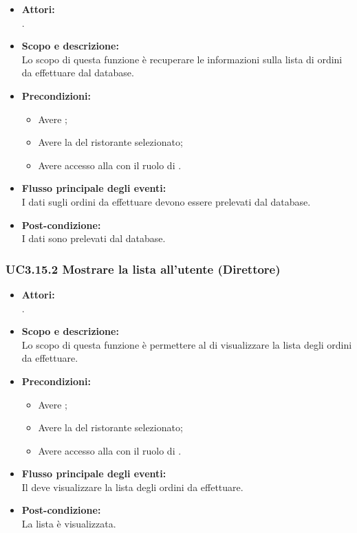 \begin{itemize}
	\item \textbf{Attori:}
	\\.
	\item \textbf{Scopo e descrizione:} 
	\\Lo scopo di questa funzione è recuperare le informazioni sulla lista di ordini da effettuare dal database.
	\item \textbf{Precondizioni:}
	\begin{itemize}
		\item Avere ;
		\item Avere la  del ristorante selezionato;
		\item Avere accesso alla  con il ruolo di .
	\end{itemize}
	\item \textbf{Flusso principale degli eventi:}
	\\I dati sugli ordini da effettuare devono essere prelevati dal database.
	\item \textbf{Post-condizione:}
	\\I dati sono prelevati dal database.
\end{itemize}

\subsubsection{UC3.15.2 Mostrare la lista all'utente (Direttore)} \label{UC3.15.2}

\begin{itemize}
	\item \textbf{Attori:}
	\\.
	\item \textbf{Scopo e descrizione:} 
	\\Lo scopo di questa funzione è permettere al  di visualizzare la lista degli ordini da effettuare.
	\item \textbf{Precondizioni:}
	\begin{itemize}
		\item Avere ;
		\item Avere la  del ristorante selezionato;
		\item Avere accesso alla  con il ruolo di .
	\end{itemize}
	\item \textbf{Flusso principale degli eventi:}
	\\Il {} deve visualizzare la lista degli ordini da effettuare.
	\item \textbf{Post-condizione:}
	\\La lista è visualizzata.
\end{itemize}

